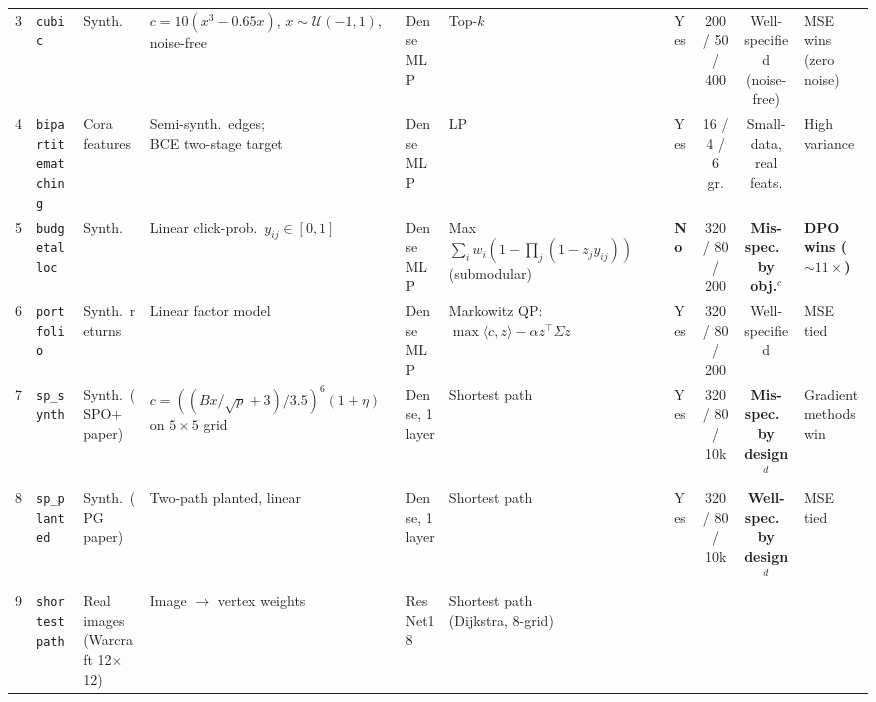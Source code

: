 \begin{table}
\begin{adjustbox}{max width=\linewidth}
\begin{tabular}{@{}cllllllccl@{}}
        3  & \texttt{cubic}
           & Synth.
           & \makecell[l]{$c = 10(x^{3} - 0.65x)$,\\ $x\!\sim\!\mathcal{U}(-1,1)$, noise-free}
           & Dense MLP
           & Top-$k$
           & Yes
           & 200 / 50 / 400
           & Well-specified (noise-free)
           & MSE wins (zero noise) \\
        4  & \texttt{bipartitematching}
           & Cora features
           & \makecell[l]{Semi-synth.\ edges;\\ BCE two-stage target}
           & Dense MLP
           & LP
           & Yes
           & 16 / 4 / 6 gr.
           & Small-data, real feats.
           & High variance \\
        5  & \texttt{budgetalloc}
           & Synth.
           & Linear click-prob.\ $y_{ij}\!\in\![0,1]$
           & Dense MLP
           & \makecell[l]{Max $\sum_i w_i(1-\prod_j(1-z_j y_{ij}))$\\ (submodular)}
           & \textbf{No}
           & 320 / 80 / 200
           & \textbf{Mis-spec.\ by obj.}$^{c}$
           & \textbf{DPO wins ($\sim\!11\times$)} \\
        6  & \texttt{portfolio}
           & Synth.\ returns
           & Linear factor model
           & Dense MLP
           & \makecell[l]{Markowitz QP:\\ $\max\langle c,z\rangle-\alpha z^\top\!\Sigma z$}
           & Yes
           & 320 / 80 / 200
           & Well-specified
           & MSE tied \\
        7  & \texttt{sp\_synth}
           & Synth.\ (SPO+ paper)
           & \makecell[l]{$c=((Bx/\sqrt{p}+3)/3.5)^{6}(1+\eta)$\\ on $5\!\times\!5$ grid}
           & Dense, 1 layer
           & Shortest path
           & Yes
           & 320 / 80 / 10k
           & \textbf{Mis-spec.\ by design}$^{d}$
           & Gradient methods win \\
        8  & \texttt{sp\_planted}
           & Synth.\ (PG paper)
           & Two-path planted, linear
           & Dense, 1 layer
           & Shortest path
           & Yes
           & 320 / 80 / 10k
           & \textbf{Well-spec.\ by design}$^{d}$
           & MSE tied \\
        9  & \texttt{shortestpath}
           & \makecell[l]{Real images\\ (Warcraft 12$\times$12)}
           & Image $\to$ vertex weights
           & ResNet18
           & \makecell[l]{Shortest path\\ (Dijkstra, 8-grid)}

\end{tabular}
\end{adjustbox}
\end{table}
